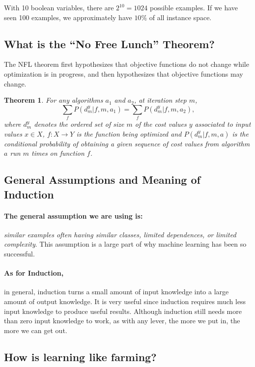 \documentclass[10pt]{article}
\newtheorem{theorem}{Theorem}%
\begin{document}
With 10 boolean variables, there are $2^{10} = 1024$ possible examples. If we
have seen 100 examples, we approximately have $10\%$ of all instance space.

\subsection{What is the ``No Free Lunch'' Theorem?}

The NFL theorem first hypothesizes that objective functions do not change while
optimization is in progress, and then hypothesizes that objective functions may
change.

\begin{theorem}
    For any algorithms $a_1$ and $a_2$, at iteration step $m$,
    \[\sum_f P\left(d_m^y|f,m,a_1\right)=\sum_f P(d_m^y|f,m,a_2)\text{,}\]
    where $d_m^y$ denotes the ordered set of size $m$ of the cost values $y$
    associated to input values $x\in X$, $f:X \rightarrow Y$ is the function
    being optimized and $P(d_m^y|f,m,a)$ is the conditional probability of
    obtaining a given sequence of cost values from algorithm $a$ run $m$ times
    on function $f$.
\end{theorem}

\subsection{General Assumptions and Meaning of Induction}

\paragraph{The general assumption we are using is:} \emph{similar examples
often having similar classes, limited dependences, or limited complexity}. This
assumption is a large part of why machine learning has been so successful.

\paragraph{As for Induction,} in general, induction turns a small amount of
input knowledge into a large amount of output knowledge. It is very useful
since induction requires much less input knowledge to produce useful results.
Although induction still needs more than zero input knowledge to work, as with
any lever, the more we put in, the more we can get out.

\subsection{How is learning like farming? }
\end{document}
